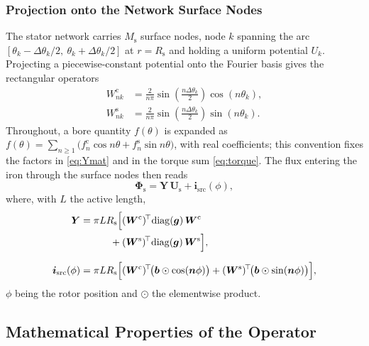 \documentclass[10pt,a4paper,twocolumn]{article}
\newcommand{\Rs}{R_{\mathrm{s}}}
\theoremstyle{plain}
\theoremstyle{remark}
\begin{document}
\subsubsection{Projection onto the Network Surface Nodes}
\label{sub:proj}

The stator network carries $M_{\mathrm{s}}$ surface nodes, node $k$
spanning the arc $[\theta_k-\Delta\theta_k/2,\
\theta_k+\Delta\theta_k/2]$ at $r=\Rs$ and holding a uniform potential
$U_k$. Projecting a piecewise-constant potential onto the Fourier basis
gives the rectangular operators
\begin{equation}
\begin{aligned}
W^{\mathrm{c}}_{nk} &= \frac{2}{n\pi}
\sin\!\left(\frac{n\Delta\theta_k}{2}\right)\cos(n\theta_k),\\
W^{\mathrm{s}}_{nk} &= \frac{2}{n\pi}
\sin\!\left(\frac{n\Delta\theta_k}{2}\right)\sin(n\theta_k) .
\end{aligned}
\label{eq:W}
\end{equation}
Throughout, a bore quantity $f(\theta)$ is expanded as
$f(\theta)=\sum_{n\ge1}\big(f_n^{\mathrm{c}}\cos n\theta
+ f_n^{\mathrm{s}}\sin n\theta\big)$, with real coefficients; this
convention fixes the factors in \eqref{eq:Ymat} and in the torque sum
\eqref{eq:torque}. The flux entering the iron through the surface nodes
then reads
\begin{equation}
\bm{\Phi}_{\mathrm{s}} = \bm{Y}\,\bm{U}_{\mathrm{s}}
+ \bm{i}_{\mathrm{src}}(\phi) ,
\label{eq:Y}
\end{equation}
where, with $L$ the active length,
\begin{align}
\bm{Y} &= \pi L \Rs
\Bigl[(\bm{W}^{\mathrm{c}})^{\!\top}\!\operatorname{diag}(\bm{g})\,
\bm{W}^{\mathrm{c}}\notag\\
&\qquad\quad
+(\bm{W}^{\mathrm{s}})^{\!\top}\!\operatorname{diag}(\bm{g})\,
\bm{W}^{\mathrm{s}}\Bigr],
\label{eq:Ymat}\\[1.5ex]
\bm{i}_{\mathrm{src}}(\phi) &= \pi L \Rs
\Bigl[(\bm{W}^{\mathrm{c}})^{\!\top}\!
\big(\bm{b}\odot\cos(\bm{n}\phi)\big)
+(\bm{W}^{\mathrm{s}})^{\!\top}\!
\big(\bm{b}\odot\sin(\bm{n}\phi)\big)\Bigr],
\label{eq:isrc}
\end{align}
$\phi$ being the rotor position and $\odot$ the elementwise product.

\subsection{Mathematical Properties of the Operator}
\label{sub:props}
\end{document}
